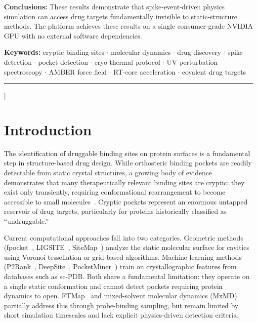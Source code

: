 \documentclass{sn-jnl}
\begin{document}
\begin{center}
{\smallskip\noindent\textbf{Conclusions:}
These results demonstrate that spike-event-driven physics simulation can access drug targets
fundamentally invisible to static-structure methods. The platform achieves these results on a
single consumer-grade NVIDIA GPU with no external software dependencies.

\smallskip\noindent\textbf{Keywords:} cryptic binding sites $\cdot$ molecular dynamics $\cdot$ drug discovery $\cdot$
spike detection $\cdot$ pocket detection $\cdot$ cryo-thermal protocol $\cdot$ UV
perturbation spectroscopy $\cdot$ AMBER force field $\cdot$ RT-core acceleration $\cdot$
covalent drug targets

\medskip
\centering\rule{0.6\textwidth}{0.4pt}
}%
\end{center}
\vspace{1em}
]

\section{Introduction}

The identification of druggable binding sites on protein surfaces is a fundamental step in
structure-based drug design. While orthosteric binding pockets are readily detectable from
static crystal structures, a growing body of evidence demonstrates that many therapeutically
relevant binding sites are cryptic: they exist only transiently, requiring conformational
rearrangement to become accessible to small molecules~\cite{cimermancic2016,vajda2018}.
Cryptic pockets represent an enormous untapped reservoir of drug targets, particularly for
proteins historically classified as ``undruggable.''

Current computational approaches fall into two categories. Geometric methods
(fpocket~\cite{leguilloux2009}, LIGSITE~\cite{hendlich1997}, SiteMap~\cite{halgren2009})
analyze the static molecular surface for cavities using Voronoi tessellation or grid-based
algorithms. Machine learning methods (P2Rank~\cite{krivak2018},
DeepSite~\cite{jimenez2017}, PocketMiner~\cite{meller2023}) train on crystallographic
features from databases such as sc-PDB. Both share a fundamental limitation: they operate on
a single static conformation and cannot detect pockets requiring protein dynamics to open.
FTMap~\cite{kozakov2015} and mixed-solvent molecular dynamics
(MxMD)~\cite{ghanakota2016,lexa2012} partially address this through probe-binding sampling,
but remain limited by short simulation timescales and lack explicit physics-driven detection
criteria.
\end{document}
